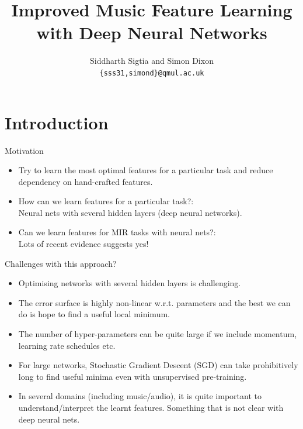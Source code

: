 \documentclass{beamer}
\title[Feature Learning with Neural Nets]{\Large{Improved Music Feature Learning with Deep Neural Networks} }
\author[S. Sigtia and S. Dixon]{Siddharth Sigtia and Simon Dixon\\ \texttt{\scriptsize{\{sss31,simond\}@qmul.ac.uk}}}
\institute[C4DM]{Centre for Digital Music\\Queen Mary University of London}
\date{}
\begin{document}
\begin{frame}
  \titlepage
\end{frame}


\section{Introduction}


\begin{frame}{Motivation}
\vspace{-0.15in}
  \begin{itemize}
  \item Try to learn the most optimal features for a particular task and reduce dependency on hand-crafted features.
  \item { How can we learn features for a particular task?}:
    \\Neural nets with several hidden layers (deep neural networks).  
  \item { Can we learn features for MIR tasks with neural nets?}: 
    \\Lots of recent evidence suggests yes!     
  \end{itemize}
\end{frame}


\begin{frame}{Challenges with this approach?}
  \begin{itemize}
    \item Optimising networks with several hidden layers is challenging. 
    \item The error surface is highly non-linear w.r.t. parameters and the best we can do is hope to find a useful local minimum. 
    \item The number of hyper-parameters can be quite large if we include momentum, learning rate schedules etc.   
    \item For large networks, Stochastic Gradient Descent (SGD) can take prohibitively long to find useful minima even with unsupervised pre-training. 
    \item In several domains (including music/audio), it is quite important to understand/interpret the learnt features. Something that is not clear with deep neural nets. 
  \end{itemize}
\end{frame}
\end{document}
